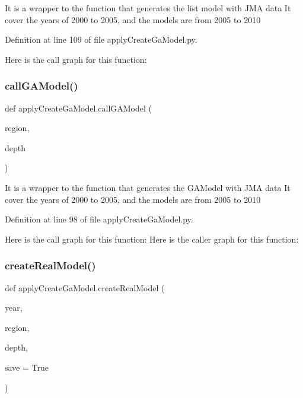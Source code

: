 \begin{DoxyVerb}It is a wrapper to the function that generates the list model with JMA data
It cover the years of 2000 to 2005, and the models are from 2005 to 2010
\end{DoxyVerb}
 

Definition at line 109 of file apply\+Create\+Ga\+Model.\+py.

Here is the call graph for this function\+:
\mbox{\label{namespaceapply_create_ga_model_a722494b5d31181cb3688c006372c8751}} 
\subsubsection{\texorpdfstring{call\+G\+A\+Model()}{callGAModel()}}
{\footnotesize\ttfamily def apply\+Create\+Ga\+Model.\+call\+G\+A\+Model (\begin{DoxyParamCaption}\item[{}]{region,  }\item[{}]{depth }\end{DoxyParamCaption})}

\begin{DoxyVerb}It is a wrapper to the function that generates the GAModel with JMA data
It cover the years of 2000 to 2005, and the models are from 2005 to 2010
\end{DoxyVerb}
 

Definition at line 98 of file apply\+Create\+Ga\+Model.\+py.

Here is the call graph for this function\+:
Here is the caller graph for this function\+:
\mbox{\label{namespaceapply_create_ga_model_a96a0cdc0dba9ffa94749e9b4ed1cdbac}} 
\subsubsection{\texorpdfstring{create\+Real\+Model()}{createRealModel()}}
{\footnotesize\ttfamily def apply\+Create\+Ga\+Model.\+create\+Real\+Model (\begin{DoxyParamCaption}\item[{}]{year,  }\item[{}]{region,  }\item[{}]{depth,  }\item[{}]{save = {\ttfamily True} }\end{DoxyParamCaption})}

